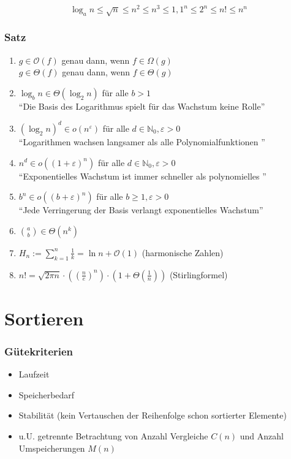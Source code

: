 \documentclass{scrartcl}
\begin{document}
\begin{shaded}
\[ \log_a{n} \leq \sqrt{n} \leq n^2 \leq n^3 \leq 1,1^n \leq 2^n \leq n! \leq n^n\]
\end{shaded}

\subsubsection{Satz}
\begin{enumerate}
	\item $g \in \mathcal{O}(f) $ genau dann, wenn $f \in \Omega(g) $
	\\ $g \in \Theta(f) $ genau dann, wenn $f \in \Theta(g) $
	\item $\log_b{n} \in \Theta (\log_2{n}) $ für alle $b>1$ \\
	"`Die Basis des Logarithmus spielt für das Wachstum keine Rolle"'
	\item $ (\log_2{n})^d \in o(n^\varepsilon) $ für alle $d \in \mathds{N}_0, \varepsilon>0$\\
	"`Logarithmen wachsen langsamer als alle Polynomialfunktionen "'
	\item $ n^d \in o((1+\varepsilon)^n) $ für alle $d\in \mathds{N}_0, \varepsilon>0$\\
	"`Exponentielles Wachstum ist immer schneller als polynomielles "'
	\item $ b^n \in o((b+\varepsilon)^n) $ für alle $b\geq 1, \varepsilon>0$ \\
	"`Jede Verringerung der Basis verlangt exponentielles Wachstum"'
	\item $ \binom{a}{b} \in \Theta(n^k)$
	\item $H_n := \sum^n_{k=1} \frac{1}{k} = \ln n + \mathcal{O}(1)$ {\tiny (harmonische Zahlen)}
	\item $n! = \sqrt{2\pi n} \cdot \left( \left( \frac{n}{e}\right)^n \right) \cdot \left( 1+\Theta \left( \frac{1}{n} \right) \right)$ {\tiny (Stirlingformel)}
\end{enumerate}



\section{Sortieren}
\subsubsection{Gütekriterien}
\begin{itemize}
	\item Laufzeit
	\item Speicherbedarf
	\item Stabilität (kein Vertauschen der Reihenfolge schon sortierter Elemente)
	\item u.U. getrennte Betrachtung von Anzahl Vergleiche $C(n)$ und Anzahl Umspeicherungen $M(n)$
\end{itemize}
\end{document}
